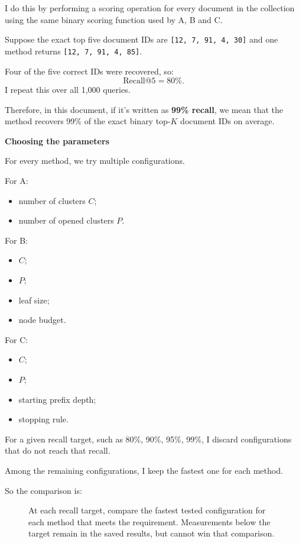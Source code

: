 I do this by performing a scoring operation for every document in the collection using the same binary scoring function used by A, B and C.

Suppose the exact top five document IDs are \texttt{[12, 7, 91, 4, 30]} and one method returns \texttt{[12, 7, 91, 4, 85]}.

Four of the five correct IDs were recovered, so:
\[
\mathrm{Recall@5}=80\%.
\]
I repeat this over all 1,000 queries.

Therefore, in this document, if it's written as \textbf{99\% recall}, we mean that the method recovers 99\% of the exact binary top-$K$ document IDs on average.

\textbf{Choosing the parameters}\par
For every method, we try multiple configurations.

For A:
\begin{itemize}\setlength{\itemsep}{1pt}
\item number of clusters $C$;
\item number of opened clusters $P$.
\end{itemize}
For B:
\begin{itemize}\setlength{\itemsep}{1pt}
\item $C$;
\item $P$;
\item leaf size;
\item node budget.
\end{itemize}
For C:
\begin{itemize}\setlength{\itemsep}{1pt}
\item $C$;
\item $P$;
\item starting prefix depth;
\item stopping rule.
\end{itemize}
For a given recall target, such as 80\%, 90\%, 95\%, 99\%, I discard configurations that do not reach that recall.

Among the remaining configurations, I keep the fastest one for each method.

So the comparison is:
\begin{figure}[htbp]\centering
{}
\caption{At each recall target, compare the fastest tested configuration for each method that meets the requirement. Measurements below the target remain in the saved results, but cannot win that comparison.}
\end{figure}



